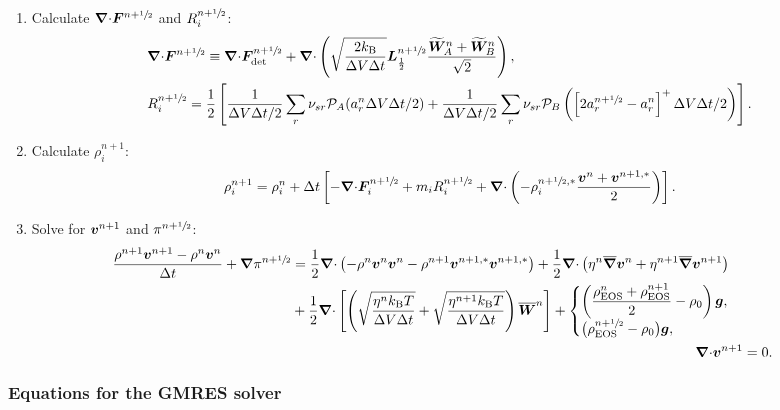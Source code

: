 \documentclass[
10pt
showpacs, showkeys,
amsmath,amssymb,
aps,
pre,
floatfix,
]{revtex4-1}
\newcommand{\divg}{{\V\nabla\cdot}}                       %
\begin{document}
\begin{enumerate}
\item Calculate $\divg\V{F}^{n+\myhalf}$ and $R^{n+\sfrac{1}{2}}_i$:
\begin{align}
&\divg\V{F}^{n+\myhalf} \equiv \divg\V{F}_\mathrm{det}^{n+\myhalf} +
\divg\left( \sqrt{ \frac{2k_\mathrm{B}}{\D{V}\D{t}} } \V{L}^{n+\myhalf}_{\frac12} \frac{\widetilde{\V{W}}^n_A+\widetilde{\V{W}}^n_B}{\sqrt{2}} \right),
\\
&R^{n+\myhalf}_i = \frac{1}{2}\left[ \frac{1}{\D{V}\D{t}/2} \sum_r \nu_{sr} \mathcal{P}_A(a^n_r\D{V}\D{t}/2) + \frac{1}{\D{V}\D{t}/2} \sum_r \nu_{sr} \mathcal{P}_B\left( \left[ 2 a^{n+\myhalf}_r - a^n_r \right]^+ \D{V}\D{t}/2 \right) \right].
\end{align}

\item Calculate $\rho^{n+1}_i$:
\begin{equation}
\rho^{n+1}_i = \rho^n_i + \D{t} \left[ -\divg\V{F}^{n+\myhalf}_i + m_i R^{n+\myhalf}_i 
+ \divg\left( -\rho^{n+\myhalf,*}_i \frac{\V{v}^n + \V{v}^{n+1,*}}{2} \right) \right].
\end{equation} 

\item Solve for $\boldsymbol{v}^{n+1}$ and $\pi^{n+\sfrac{1}{2}}$:
\begin{align}
\label{boussinesq_stokes_v_2nd}
\begin{split}
\frac{\rho^{n+1}\V{v}^{n+1}-\rho^n\V{v}^n}{\D{t}} + \grad\pi^{n+\myhalf}
&= \frac{1}{2}\divg\left(-\rho^n\V{v}^n\V{v}^n-\rho^{n+1}\V{v}^{n+1,*}\V{v}^{n+1,*}\right) 
+ \frac{1}{2}\divg\left( \eta^n \overline{\grad}\V{v}^n + \eta^{n+1} \overline{\grad}\V{v}^{n+1} \right) \\
&+ \frac{1}{2}\divg\left[\left( \sqrt{\frac{\eta^n k_\mathrm{B}T}{\D{V}\D{t}}} + \sqrt{\frac{\eta^{n+1} k_\mathrm{B}T}{\D{V}\D{t}}} \right) \overline{\V{W}}^n \right]
+ 
\begin{cases}
\displaystyle \left(\frac{\rho^n_\mathrm{EOS}+\rho^{n+1}_\mathrm{EOS}}{2}-\rho_0\right)\V{g}, \\
\big(\rho^{n+\myhalf}_\mathrm{EOS}-\rho_0\big)\V{g}, 
\end{cases}
\end{split} \\
\label{boussinesq_stokes_p_2nd}
\divg\V{v}^{n+1} & = 0.
\end{align}

\end{enumerate}



\subsubsection*{Equations for the GMRES solver}
\end{document}
